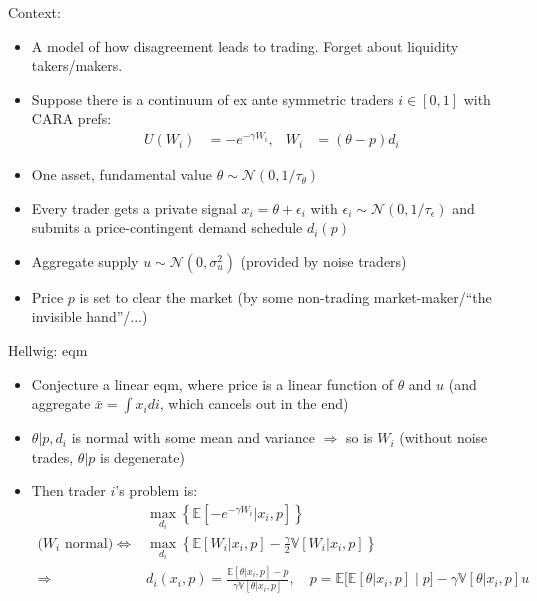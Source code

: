 \documentclass[english,10pt
,aspectratio=169
]{beamer}
\begin{document}
\begin{frame}{Context: \cite{hellwig_aggregation_1980}}
	\begin{itemize}
		\item A model of how disagreement leads to trading. Forget about liquidity takers/makers.
		\item Suppose there is a continuum of ex ante symmetric traders $i \in [0,1]$ with CARA prefs:
		\begin{align*}
			U(W_i)&=-e^{-\gamma W_i}, &
			W_i & = (\theta - p){d_i}
		\end{align*}
		\item One asset, fundamental value $\theta \sim \mathcal{N}(0,1/\tau_\theta)$
		\item Every trader gets a private signal $x_i = \theta + \epsilon_i$ with $\epsilon_i \sim \mathcal{N}(0,1/\tau_\epsilon)$ and submits a price-contingent demand schedule $d_i(p)$
		\item Aggregate supply $u \sim \mathcal{N}(0, \sigma^2_u)$ (provided by noise traders)
		\item Price $p$ is set to clear the market (by some non-trading market-maker/``the invisible hand''/...)
	\end{itemize}
\end{frame}


\begin{frame}{Hellwig: eqm}
	\begin{itemize}
		\item Conjecture a linear eqm, where price is a linear function of $\theta$ and $u$ (and aggregate $\bar{x} = \int x_i di$, which cancels out in the end)
		\item $\theta | p,d_i$ is normal with some mean and variance $\Rightarrow$ so is $W_i$
		(without noise trades, $\theta|p$ is degenerate)
		
		\item Then trader $i$'s problem is:
		\begin{align*}
			&\max_{d_i} \left\{ \mathbb{E} \left[ -e^{-\gamma W_i} | x_i, p \right] \right\} 
			\\
			\text{($W_i$ normal)} \iff 
			&\max_{d_i} \left\{\mathbb{E} \left[ W_i| x_i, p\right] - \frac{\gamma}{2} \mathbb{V}\left[W_i| x_i, p \right] \right\}
			\\
			\Rightarrow & d_i(x_i,p) = \frac{\mathbb{E} \left[ \theta | x_i, p\right] - p}{\gamma \mathbb{V} \left[ \theta| x_i, p\right]}, \quad p= \mathbb{E} \Big[ \mathbb{E} [\theta|x_i,p] \mid p \Big] - \gamma \mathbb{V} \left[ \theta| x_i, p\right] u
		\end{align*}
	\end{itemize}
\end{frame}
\end{document}
